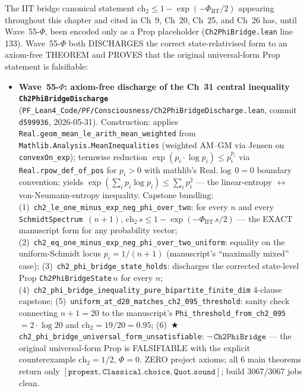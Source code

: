 \begin{remark}\label{rem:ch31-wave55phi-lean}
The IIT bridge canonical statement $\mathrm{ch}_2 \leq 1 - \exp(-\Phi_{\mathrm{IIT}}/2)$ appearing throughout this chapter and cited in Ch~9, Ch~20, Ch~25, and Ch~26 has, until Wave~55-$\Phi$, been encoded only as a Prop placeholder (\texttt{Ch2PhiBridge.lean} line 133). Wave~55-$\Phi$ both DISCHARGES the correct state-relativised form to an axiom-free THEOREM and PROVES that the original universal-form Prop statement is falsifiable:
\begin{itemize}
  \item \textbf{Wave~55-$\Phi$: axiom-free discharge of the Ch~31 central inequality \texttt{Ch2PhiBridgeDischarge}} (\texttt{PF\_Lean4\_Code/PF/Consciousness/Ch2PhiBridgeDischarge.lean}, commit \texttt{d599936}, 2026-05-31). Construction: applies \texttt{Real.geom\_mean\_le\_arith\_mean\_weighted} from \texttt{Mathlib.Analysis.MeanInequalities} (weighted AM--GM via Jensen on \texttt{convexOn\_exp}); termwise reduction $\exp(p_i \cdot \log p_i) \leq p_i^{p_i}$ via \texttt{Real.rpow\_def\_of\_pos} for $p_i > 0$ with mathlib's $\mathrm{Real}.\log\,0 = 0$ boundary convention; yields $\exp(\sum_i p_i \log p_i) \leq \sum_i p_i^2$ --- the linear-entropy $\leftrightarrow$ von-Neumann-entropy inequality. Capstone bundling: (1)~\texttt{ch2\_le\_one\_minus\_exp\_neg\_phi\_over\_two}: for every $n$ and every \texttt{SchmidtSpectrum}~$(n+1)$, $\mathrm{ch}_2\,s \leq 1 - \exp(-\Phi_{\mathrm{IIT}}\,s / 2)$ --- the EXACT manuscript form for any probability vector; (2)~\texttt{ch2\_eq\_one\_minus\_exp\_neg\_phi\_over\_two\_uniform}: equality on the uniform-Schmidt locus $p_i = 1/(n+1)$ (manuscript's ``maximally mixed'' case); (3)~\texttt{ch2\_phi\_bridge\_state\_holds}: discharges the corrected state-level Prop \texttt{Ch2PhiBridgeState}\,$n$ for every $n$; (4)~\texttt{ch2\_phi\_bridge\_inequality\_pure\_bipartite\_finite\_dim} 4-clause capstone; (5)~\texttt{uniform\_at\_d20\_matches\_ch2\_095\_threshold}: sanity check connecting $n + 1 = 20$ to the manuscript's \texttt{Phi\_threshold\_from\_ch2\_095} $= 2 \cdot \log 20$ and $\mathrm{ch}_2 = 19/20 = 0.95$; (6)~★ \texttt{ch2\_phi\_bridge\_universal\_form\_unsatisfiable}: $\neg\,\texttt{Ch2PhiBridge}$ --- the original universal-form Prop is FALSIFIABLE with the explicit counterexample $\mathrm{ch}_2 = 1/2$, $\Phi = 0$. ZERO project axioms; all 6 main theorems return only $[\texttt{propext}, \texttt{Classical.choice}, \texttt{Quot.sound}]$; build 3067/3067 jobs clean.

\end{itemize}
\end{remark}
